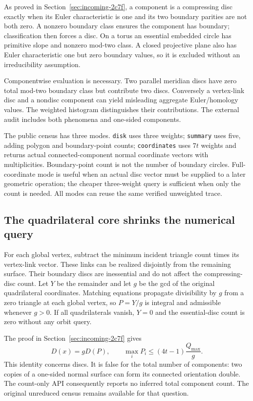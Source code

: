 As proved in Section~\ref{sec:incoming-2c7f}, a component is a compressing
disc exactly when its Euler characteristic is one and its two boundary
parities are not both zero. A nonzero boundary class ensures the component
has boundary; classification then forces a disc. On a torus an essential
embedded circle has primitive slope and nonzero mod-two class. A closed
projective plane also has Euler characteristic one but zero boundary values,
so it is excluded without an irreducibility assumption.

Componentwise evaluation is necessary. Two parallel meridian discs have zero
total mod-two boundary class but contribute two discs. Conversely a
vertex-link disc and a nondisc component can yield misleading aggregate
Euler/homology values. The weighted histogram distinguishes their contributions.
The external audit includes both phenomena and one-sided components.

The public census has three modes. \texttt{disk} uses three weights;
\texttt{summary} uses five, adding polygon and boundary-point counts;
\texttt{coordinates} uses $7t$ weights and returns actual connected-component
normal coordinate vectors with multiplicities. Boundary-point count is not
the number of boundary circles. Full-coordinate mode is useful when an actual
disc vector must be supplied to a later geometric operation; the cheaper
three-weight query is sufficient when only the count is needed. All modes
can reuse the same verified unweighted trace.

\subsection{The quadrilateral core shrinks the numerical query}

For each global vertex, subtract the minimum incident triangle count times
its vertex-link vector. These links can be realized disjointly from the
remaining surface. Their boundary discs are inessential and do not affect
the compressing-disc count. Let $Y$ be the remainder and let $g$ be the gcd
of the original quadrilateral coordinates. Matching equations propagate
divisibility by $g$ from a zero triangle at each global vertex, so $P=Y/g$
is integral and admissible whenever $g>0$. If all quadrilaterals vanish,
$Y=0$ and the essential-disc count is zero without any orbit query.

The proof in Section~\ref{sec:incoming-2c7f} gives
\[
 D(x)=gD(P),\qquad
 \max_i P_i\le(4t-1)\frac{Q_{\max}}g.
\]
This identity concerns discs. It is false for the total number of components:
two copies of a one-sided normal surface can form its connected orientation
double. The count-only API consequently reports no inferred total component
count. The original unreduced census remains available for that question.

